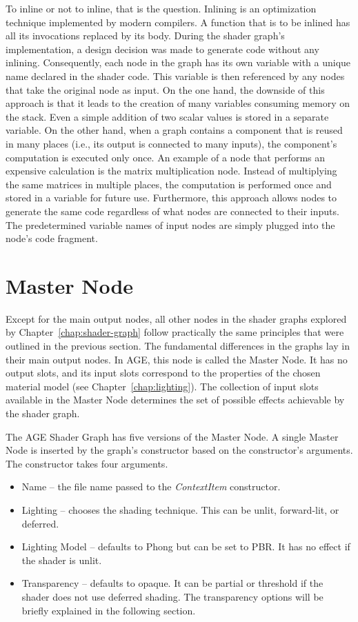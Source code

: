 \documentclass[
  digital,     %
  oneside,     %
  nosansbold,  %
  nocolorbold, %
  lof,         %
  lot,         %
]{fithesis4}
\begin{document}
To inline or not to inline, that is the question. Inlining is an optimization technique
implemented by modern compilers. A function that is to be inlined has all its invocations
replaced by its body. During the shader graph's implementation, a design
decision was made to generate code without any inlining. Consequently, each node in the graph has its own
variable with a unique name declared in the shader code. This variable is then
referenced by any nodes that take the original node as input. On the one hand,
the downside of this approach is that it leads to the creation of many variables consuming memory on the stack.
Even a simple addition of two scalar values is stored in a separate variable. On the other hand,
when a graph contains a component that is reused in many places (i.e., its output is connected to many inputs),
the component's computation is executed only once. An example of a node that performs an expensive
calculation is the matrix multiplication node. Instead of multiplying the same matrices in multiple
places, the computation is performed once and stored in a variable for future use. Furthermore,
this approach allows nodes to generate the same code regardless of what nodes are connected
to their inputs. The predetermined variable names of input nodes are simply plugged into
the node's code fragment.

\section{Master Node}
Except for the main output nodes, all other nodes in the shader graphs explored by Chapter~\ref{chap:shader-graph}
follow practically the same principles that were outlined in the previous section.
The fundamental differences in the graphs lay in their main output nodes. In AGE, this node
is called the Master Node. It has no output slots, and its input slots correspond to the properties
of the chosen material model (see Chapter~\ref{chap:lighting}). The collection of input slots available in the Master Node
determines the set of possible effects achievable by the shader graph.

The AGE Shader Graph has five versions of the Master Node. A single Master Node
is inserted by the graph's constructor based on the constructor's arguments.
The constructor takes four arguments.
\begin{itemize}
    \item Name -- the file name passed to the \textit{ContextItem} constructor.
    \item Lighting -- chooses the shading technique. This can be unlit, forward-lit, or deferred.
    \item Lighting Model -- defaults to Phong but can be set to PBR. It has no effect if the shader is unlit.
    \item Transparency -- defaults to opaque. It can be partial or threshold if the shader does not use
    deferred shading. The transparency options will be briefly explained in the following section.
\end{itemize}
\end{document}
